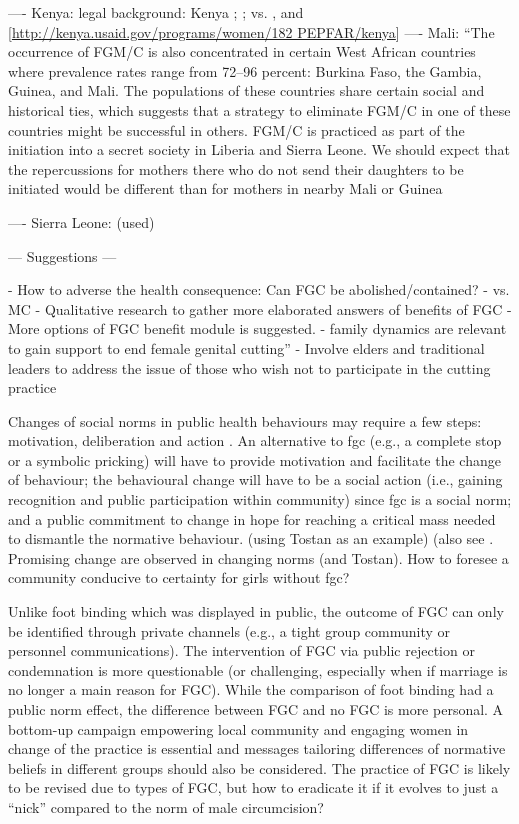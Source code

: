 \documentclass[12pt,]{article}
\begin{document}


---- Kenya: legal background:  Kenya \cite{GKEN01}; \cite{UNIC13}; 
 vs. \cite{Chia14, Hayf05}, and [\url{http://kenya.usaid.gov/programs/women/182 PEPFAR/kenya}]
---- Mali: ``The occurrence of FGM/C is also concentrated in certain West African countries where prevalence rates range from 72–96 percent: Burkina Faso, the Gambia, Guinea, and Mali. The populations of these countries share certain social and historical ties, which suggests that a strategy to eliminate FGM/C in one of these countries might be successful in others. FGM/C is practiced as part of the initiation into a secret society in Liberia and Sierra Leone. We should expect that the repercussions for mothers there who do not send their daughters to be initiated would be different than for mothers in nearby Mali or Guinea \cite{YodaWang13}

---- Sierra Leone: 
\cite{Sagn14}  (used) 


— Suggestions —

- How to adverse the health consequence:  Can FGC be abolished/contained?
- vs. MC
- Qualitative research to gather more elaborated answers of benefits of FGC
- More options of FGC benefit module is suggested.
- family dynamics are relevant to gain support to end female genital cutting”\cite{Hayf06}
- Involve elders and traditional leaders to address the issue of those who wish not to participate in the cutting practice \cite{ChegAske04, more}

Changes of social norms in public health behaviours may require a few steps:  motivation, deliberation and action \cite{CislHeis18a}.  An alternative to fgc (e.g., a complete stop or a symbolic pricking) will have to provide motivation and facilitate the change of behaviour; the behavioural change will have to be a social action (i.e., gaining recognition and public participation within community) since fgc is a social norm;  and a public commitment to change in hope for reaching a critical mass needed to dismantle the normative behaviour. (using Tostan as an example) (also see \cite{Youn15}.  Promising change are observed in changing norms \cite{EvanSnid19} (and Tostan).  How to foresee a community conducive to certainty for girls without fgc?

Unlike foot binding which was displayed in public, the outcome of FGC can only be identified through private channels (e.g., a tight group community or personnel communications).  The intervention of FGC via public rejection or condemnation is more questionable (or challenging, especially when if marriage is no longer a main reason for FGC).  While the comparison of foot binding had a public norm effect, the difference between FGC and no FGC is more personal.  A bottom-up campaign empowering local community and engaging women in change of the practice is essential \cite{BergDeni13b} and messages tailoring differences of normative beliefs in different groups should also be considered.  The practice of FGC is likely to be revised due to types of FGC, but how to eradicate it if it evolves to just a “nick” compared to the norm of male circumcision?
\end{document}
